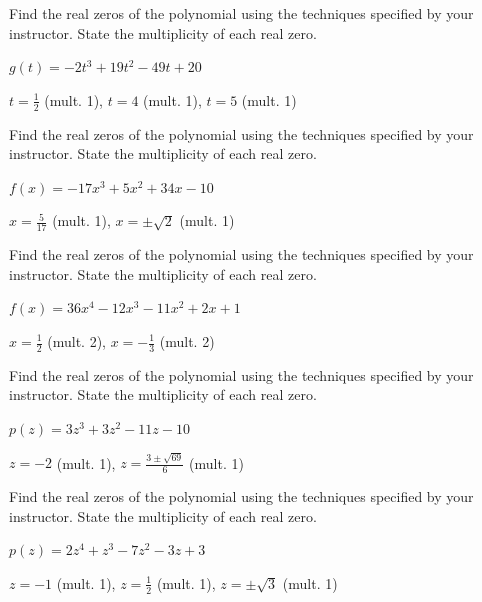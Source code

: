 \documentclass{ximera}
\begin{document}
\begin{problem}
Find the real zeros of the polynomial using the techniques specified by your instructor.  State the multiplicity of each real zero.

$g(t) = -2t^{3} + 19t^{2} - 49t + 20$

\begin{solution}
$t = \frac{1}{2}$ (mult. 1), $t = 4$ (mult. 1), $t = 5$ (mult. 1) 
\end{solution}

\end{problem}

\begin{problem}
Find the real zeros of the polynomial using the techniques specified by your instructor.  State the multiplicity of each real zero.

$f(x) = -17x^{3} + 5x^{2} + 34x - 10$

\begin{solution}
$x = \frac{5}{17}$ (mult. 1), $x = \pm \sqrt{2}$ (mult. 1)
\end{solution}

\end{problem}

\begin{problem}
Find the real zeros of the polynomial using the techniques specified by your instructor.  State the multiplicity of each real zero.

$f(x) = 36x^{4} - 12x^{3} - 11x^{2} + 2x + 1$

\begin{solution}
$x = \frac{1}{2}$ (mult. 2), $x = -\frac{1}{3}$ (mult. 2) 
\end{solution}
\end{problem}

\begin{problem}
Find the real zeros of the polynomial using the techniques specified by your instructor.  State the multiplicity of each real zero.

$p(z) = 3z^{3} + 3z^{2} - 11z - 10$

\begin{solution}
$z = -2$ (mult. 1), $z = \frac{3 \pm \sqrt{69}}{6}$ (mult. 1)
\end{solution}

\end{problem}

\begin{problem}
Find the real zeros of the polynomial using the techniques specified by your instructor.  State the multiplicity of each real zero.

$p(z) = 2z^4+z^3-7z^2-3z+3$

\begin{solution}
$z = -1$ (mult. 1), $z = \frac{1}{2}$ (mult. 1), $z = \pm \sqrt{3}$ (mult. 1)
\end{solution}

\end{problem}
\end{document}
